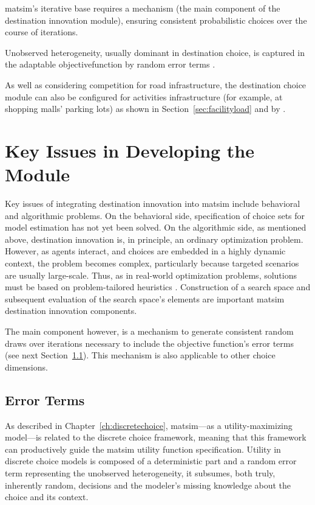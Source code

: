 \gls{matsim}'s iterative base requires a mechanism (the main component of the destination innovation module), ensuring consistent probabilistic choices over the course of iterations.

Unobserved heterogeneity, usually dominant in destination choice, is captured in the adaptable \gls{objectivefunction} by random error terms \citep[][]{HorniEtAl_unpub_TRB_2012, Horni_PhDThesis_2013}.

As well as considering competition for road infrastructure, the destination choice module can also be configured for activities infrastructure (for example, at shopping malls' parking lots) as shown in Section~\ref{sec:facilityload} and by \citet[][]{HorniEtAl_TRR_2009}.

\section{Key Issues in Developing the Module}
Key issues of integrating destination innovation into \gls{matsim} include behavioral and algorithmic problems. 
On the behavioral side, specification of choice sets for model estimation has not yet been solved. 
On the algorithmic side, as mentioned above, destination innovation is, in principle, an ordinary optimization problem. 
However, as agents interact, and choices are embedded in a highly dynamic context, the problem becomes complex, particularly because targeted scenarios are usually large-scale. 
Thus, as in real-world optimization problems, solutions must be based on problem-tailored heuristics \citep[][]{MichalewiczFogel_2004}. 
Construction of a search space and subsequent evaluation of the search space's elements are important \gls{matsim} destination innovation components. 

The main component however, is a mechanism to generate consistent random draws over iterations necessary to include the objective function's error terms (see next Section~\ref{sec:errorterms}). 
This mechanism is also applicable to other choice dimensions.

\subsection{Error Terms}
\label{sec:errorterms}
As described in Chapter~\ref{ch:discretechoice}, \gls{matsim}---as a utility-maximizing model---is related to the discrete choice framework, meaning that this framework can productively guide the \gls{matsim} utility function specification. 
Utility in discrete choice models is composed of a deterministic part and a random error term representing the unobserved heterogeneity, \ie it subsumes, both truly, \ie inherently random, decisions and the modeler's missing knowledge about the choice and its context. 

